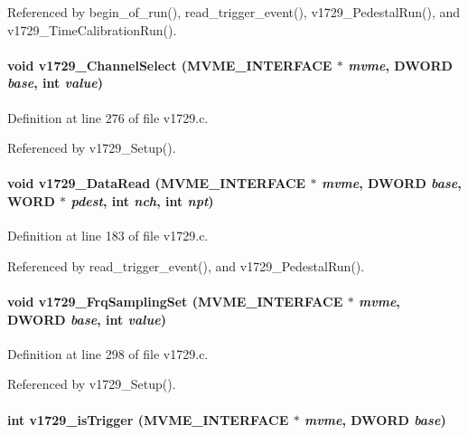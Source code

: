 Referenced by begin\_\-of\_\-run(), read\_\-trigger\_\-event(), v1729\_\-PedestalRun(), and v1729\_\-TimeCalibrationRun().
\paragraph[{v1729\_\-ChannelSelect}]{\setlength{\rightskip}{0pt plus 5cm}void v1729\_\-ChannelSelect ({\bf MVME\_\-INTERFACE} $\ast$ {\em mvme}, \/  {\bf DWORD} {\em base}, \/  int {\em value})}\hfill\label{v1729_8c_a4bcd20b1e434c5aab7dd6ceeed8cdbc6}


Definition at line 276 of file v1729.c.

Referenced by v1729\_\-Setup().
\paragraph[{v1729\_\-DataRead}]{\setlength{\rightskip}{0pt plus 5cm}void v1729\_\-DataRead ({\bf MVME\_\-INTERFACE} $\ast$ {\em mvme}, \/  {\bf DWORD} {\em base}, \/  {\bf WORD} $\ast$ {\em pdest}, \/  int {\em nch}, \/  int {\em npt})}\hfill\label{v1729_8c_ad2cf5338fac61553fb64ee8538e34dac}


Definition at line 183 of file v1729.c.

Referenced by read\_\-trigger\_\-event(), and v1729\_\-PedestalRun().
\paragraph[{v1729\_\-FrqSamplingSet}]{\setlength{\rightskip}{0pt plus 5cm}void v1729\_\-FrqSamplingSet ({\bf MVME\_\-INTERFACE} $\ast$ {\em mvme}, \/  {\bf DWORD} {\em base}, \/  int {\em value})}\hfill\label{v1729_8c_a25d60b8be95abaf6da20a59bf3a6492a}


Definition at line 298 of file v1729.c.

Referenced by v1729\_\-Setup().
\paragraph[{v1729\_\-isTrigger}]{\setlength{\rightskip}{0pt plus 5cm}int v1729\_\-isTrigger ({\bf MVME\_\-INTERFACE} $\ast$ {\em mvme}, \/  {\bf DWORD} {\em base})}\hfill\label{v1729_8c_a22cff544a108b4a9504b02997c086158}


